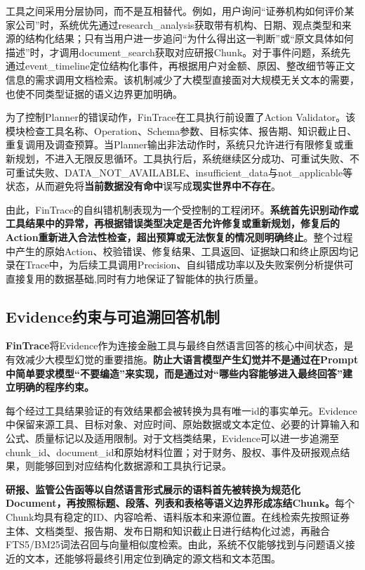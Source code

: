 工具之间采用分层协同，而不是互相替代。例如，用户询问“证券机构如何评价某家公司”时，系统优先通过research\_analysis获取带有机构、日期、观点类型和来源的结构化结果；只有当用户进一步追问“为什么得出这一判断”或“原文具体如何描述”时，才调用document\_search获取对应研报Chunk。对于事件问题，系统先通过event\_timeline定位结构化事件，再根据用户对金额、原因、整改细节等正文信息的需求调用文档检索。该机制减少了大模型直接面对大规模无关文本的需要，也使不同类型证据的语义边界更加明确。

为了控制Planner的错误动作，FinTrace在工具执行前设置了Action Validator。该模块检查工具名称、Operation、Schema参数、目标实体、报告期、知识截止日、重复调用及调查预算。当Planner输出非法动作时，系统只允许进行有限修复或重新规划，不进入无限反思循环。工具执行后，系统继续区分成功、可重试失败、不可重试失败、DATA\_NOT\_AVAILABLE、insufficient\_data与not\_applicable等状态，从而避免将\textbf{当前数据没有命中}误写成\textbf{现实世界中不存在}。

由此，FinTrace的自纠错机制表现为一个受控制的工程闭环。\textbf{系统首先识别动作或工具结果中的异常，再根据错误类型决定是否允许修复或重新规划，修复后的Action重新进入合法性检查，超出预算或无法恢复的情况则明确终止}。整个过程中产生的原始Action、校验错误、修复结果、工具返回、证据缺口和终止原因均记录在Trace中，为后续工具调用Precision、自纠错成功率以及失败案例分析提供可直接复用的数据基础,同时有力地保证了智能体的执行质量。

\subsection{Evidence约束与可追溯回答机制}

\textbf{FinTrace}将Evidence作为连接金融工具与最终自然语言回答的核心中间状态，是有效减少大模型幻觉的重要措施。\textbf{防止大语言模型产生幻觉并不是通过在Prompt中简单要求模型“不要编造”来实现，而是通过对“哪些内容能够进入最终回答”建立明确的程序约束。}

每个经过工具结果验证的有效结果都会被转换为具有唯一id的事实单元。Evidence中保留来源工具、目标对象、对应时间、原始数据或文本定位、必要的计算输入和公式、质量标记以及适用限制。对于文档类结果，Evidence可以进一步追溯至chunk\_id、document\_id和原始材料位置；对于财务、股权、事件及研报观点结果，则能够回到对应结构化数据源和工具执行记录。

\textbf{研报、监管公告函等以自然语言形式展示的语料首先被转换为规范化Document，再按照标题、段落、列表和表格等语义边界形成冻结Chunk。}每个Chunk均具有稳定的ID、内容哈希、语料版本和来源位置。在线检索先按照证券主体、文档类型、报告期、发布日期和知识截止日进行结构化过滤，再融合FTS5/BM25词法召回与向量相似度检索。由此，系统不仅能够找到与问题语义接近的文本，还能够将最终引用定位到确定的源文档和文本范围。

